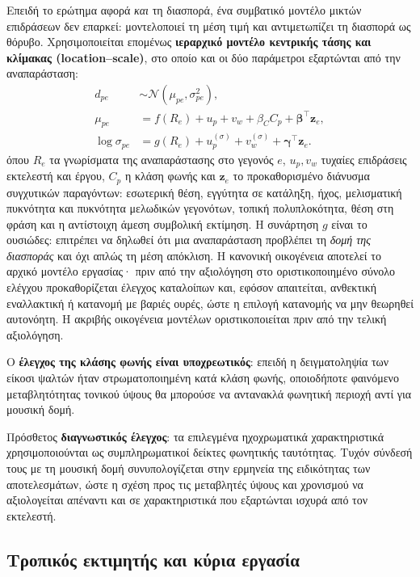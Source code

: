 \documentclass[11pt,a4paper]{article}
\begin{document}
Επειδή το ερώτημα αφορά \emph{και} τη διασπορά, ένα συμβατικό μοντέλο μικτών επιδράσεων δεν επαρκεί: μοντελοποιεί τη μέση τιμή και αντιμετωπίζει τη διασπορά ως θόρυβο. Χρησιμοποιείται επομένως \textbf{ιεραρχικό μοντέλο κεντρικής τάσης και κλίμακας (location--scale)}, στο οποίο και οι δύο παράμετροι εξαρτώνται από την αναπαράσταση:
\[
\begin{aligned}
d_{pe}&\sim\mathcal{N}(\mu_{pe},\sigma^2_{pe}),\\
\mu_{pe}&=f(R_e)+u_p+v_w+\beta_C C_p+\boldsymbol\beta^{\top}\mathbf z_e,\\
\log\sigma_{pe}&=g(R_e)+u^{(\sigma)}_p+v^{(\sigma)}_w+\boldsymbol\gamma^{\top}\mathbf z_e.
\end{aligned}
\]
όπου \(R_e\) τα γνωρίσματα της αναπαράστασης στο γεγονός \(e\), \(u_p,v_w\) τυχαίες επιδράσεις εκτελεστή και έργου, \(C_p\) η κλάση φωνής και \(\mathbf z_e\) το προκαθορισμένο διάνυσμα συγχυτικών παραγόντων: εσωτερική θέση, εγγύτητα σε κατάληξη, ήχος, μελισματική πυκνότητα και πυκνότητα μελωδικών γεγονότων, τοπική πολυπλοκότητα, θέση στη φράση και η αντίστοιχη άμεση συμβολική εκτίμηση. Η συνάρτηση \(g\) είναι το ουσιώδες: επιτρέπει να δηλωθεί ότι μια αναπαράσταση προβλέπει τη \emph{δομή της διασποράς} και όχι απλώς τη μέση απόκλιση. Η κανονική οικογένεια αποτελεί το αρχικό μοντέλο εργασίας· πριν από την αξιολόγηση στο οριστικοποιημένο σύνολο ελέγχου προκαθορίζεται έλεγχος καταλοίπων και, εφόσον απαιτείται, ανθεκτική εναλλακτική ή κατανομή με βαριές ουρές, ώστε η επιλογή κατανομής να μην θεωρηθεί αυτονόητη. Η ακριβής οικογένεια μοντέλων οριστικοποιείται πριν από την τελική αξιολόγηση.

Ο \textbf{έλεγχος της κλάσης φωνής είναι υποχρεωτικός}: επειδή η δειγματοληψία των είκοσι ψαλτών ήταν στρωματοποιημένη κατά κλάση φωνής, οποιοδήποτε φαινόμενο μεταβλητότητας τονικού ύψους θα μπορούσε να αντανακλά φωνητική περιοχή αντί για μουσική δομή.

Πρόσθετος \textbf{διαγνωστικός έλεγχος}: τα επιλεγμένα ηχοχρωματικά χαρακτηριστικά χρησιμοποιούνται ως συμπληρωματικοί δείκτες φωνητικής ταυτότητας. Τυχόν σύνδεσή τους με τη μουσική δομή συνυπολογίζεται στην ερμηνεία της ειδικότητας των αποτελεσμάτων, ώστε η σχέση προς τις μεταβλητές ύψους και χρονισμού να αξιολογείται απέναντι και σε χαρακτηριστικά που εξαρτώνται ισχυρά από τον εκτελεστή.

\subsection{Τροπικός εκτιμητής και κύρια εργασία}\label{app:stats-trop}
\end{document}

